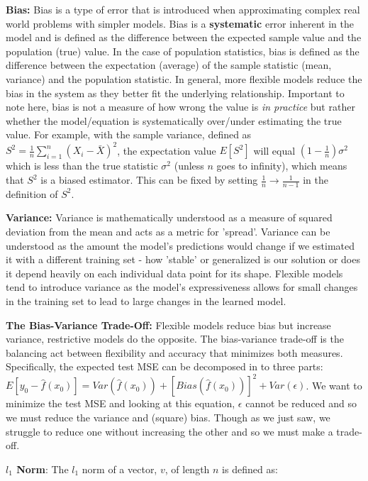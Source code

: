 \textbf{Bias:} Bias is a type of error that is introduced when approximating complex real world problems with simpler models. Bias is a \textbf{systematic} error inherent in the model and is defined as the difference between the expected sample value and the population (true) value. In the case of population statistics, bias is defined as the difference between the expectation (average) of the sample statistic (mean, variance) and the population statistic. In general, more flexible models reduce the bias in the system as they better fit the underlying relationship. Important to note here, bias is not a measure of how wrong the value is \textit{in practice} but rather whether the model/equation is systematically over/under estimating the true value. For example, with the sample variance, defined as $S^{2} = \frac{1}{n} \sum^{n}_{i=1} (X_{i} - \bar{X})^{2}$, the expectation value $E[S^{2}]$ will equal $(1-\frac{1}{n})\sigma^{2}$ which is less than the true statistic $\sigma^{2}$ (unless $n$ goes to infinity), which means that $S^{2}$ is a biased estimator. This can be fixed by setting $\frac{1}{n} \to \frac{1}{n-1}$ in the definition of $S^{2}$.

\textbf{Variance:} Variance is mathematically understood as a measure of squared deviation from the mean and acts as a metric for 'spread'. Variance can be understood as the amount the model's predictions would change if we estimated it with a different training set - how 'stable' or generalized is our solution or does it depend heavily on each individual data point for its shape. Flexible models tend to introduce variance as the model's expressiveness allows for small changes in the training set to lead to large changes in the learned model.

\textbf{The Bias-Variance Trade-Off:} Flexible models reduce bias but increase variance, restrictive models do the opposite. The bias-variance trade-off is the balancing act between flexibility and accuracy that minimizes both measures. Specifically, the expected test MSE can be decomposed in to three parts: $E[y_{0}-\hat{f}(x_{0})] = Var(\hat{f}(x_{0})) + [Bias(\hat{f}(x_{0}))]^{2} + Var(\epsilon)$. We want to minimize the test MSE and looking at this equation, $\epsilon$ cannot be reduced and so we must reduce the variance and (square) bias. Though as we just saw, we struggle to reduce one without increasing the other and so we must make a trade-off.

\textbf{$l_{1}$ Norm}: The $l_{1}$ norm of a vector, $v$, of length $n$ is defined as:

